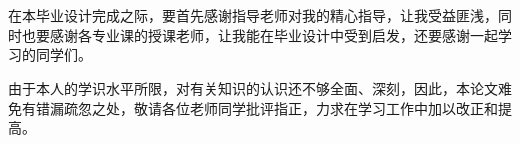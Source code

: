 \chapter{\acknowledgementtitle}

在本毕业设计完成之际，要首先感谢指导老师对我的精心指导，让我受益匪浅，同时也要感谢各专业课的授课老师，让我能在毕业设计中受到启发，还要感谢一起学习的同学们。
 
由于本人的学识水平所限，对有关知识的认识还不够全面、深刻，因此，本论文难免有错漏疏忽之处，敬请各位老师同学批评指正，力求在学习工作中加以改正和提高。